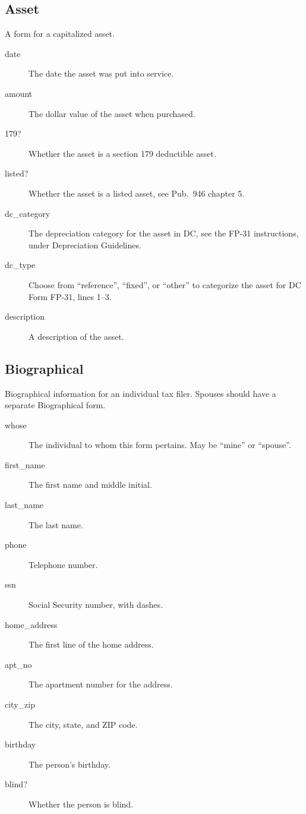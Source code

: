 \documentclass[12pt]{article}
\begin{document}
\subsection{Asset}

A form for a capitalized asset.

\begin{description}
\item[date] The date the asset was put into service.
\item[amount] The dollar value of the asset when purchased.
\item[179?] Whether the asset is a section 179 deductible asset.
\item[listed?] Whether the asset is a listed asset, see Pub.~946 chapter 5.
\item[dc\_category] The depreciation category for the asset in DC, see the FP-31
instructions, under Depreciation Guidelines.
\item[dc\_type] Choose from ``reference'', ``fixed'', or ``other'' to categorize
the asset for DC Form FP-31, lines 1--3.
\item[description] A description of the asset.
\end{description}


\subsection{Biographical}

Biographical information for an individual tax filer. Spouses should have a
separate Biographical form.

\begin{description}
\item[whose] The individual to whom this form pertains. May be ``mine'' or
``spouse''.
\item[first\_name] The first name and middle initial.
\item[last\_name] The last name.
\item[phone] Telephone number.
\item[ssn] Social Security number, with dashes.
\item[home\_address] The first line of the home address.
\item[apt\_no] The apartment number for the address.
\item[city\_zip] The city, state, and ZIP code.
\item[birthday] The person's birthday.
\item[blind?] Whether the person is blind.
\end{description}
\end{document}
